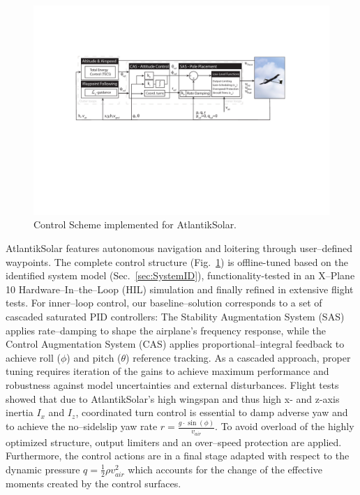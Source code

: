 
\begin{figure}[tb]
    \centering
     \includegraphics[width=\linewidth]{images/11_ControlScheme/ControlScheme.pdf}
    \caption{Control Scheme implemented for AtlantikSolar.}
    \label{fig:ControlScheme}
\end{figure}

AtlantikSolar features autonomous navigation and loitering through user--defined waypoints. The complete control structure (Fig.~\ref{fig:ControlScheme}) is offline-tuned based on the identified system model (Sec.~\ref{sec:SystemID}), functionality-tested in an X--Plane 10 Hardware--In--the--Loop (HIL) simulation and finally refined in extensive flight tests. For inner--loop control, our baseline--solution corresponds to a set of cascaded saturated PID controllers: The Stability Augmentation System (SAS) applies rate--damping to shape the airplane's frequency response, while the Control Augmentation System (CAS) applies proportional--integral feedback to achieve roll ($\phi$) and pitch ($\theta$) reference tracking. As a cascaded approach, proper tuning requires iteration of the gains to achieve maximum performance and robustness against model uncertainties and external disturbances. Flight tests showed that due to AtlantikSolar's high wingspan and thus high x- and z-axis inertia $I_x$ and $I_z$, coordinated turn control is essential to damp adverse yaw and to achieve the no--sidelslip yaw rate $r=\frac{g\cdot \sin(\phi)}{v_{air}}$. To avoid overload of the highly optimized structure, output limiters and an over--speed protection are applied. Furthermore, the control actions are in a final stage adapted with respect to the dynamic pressure $q=\frac{1}{2}\rho v^{2}_{air}$ which accounts for the change of the effective moments created by the control surfaces. 

